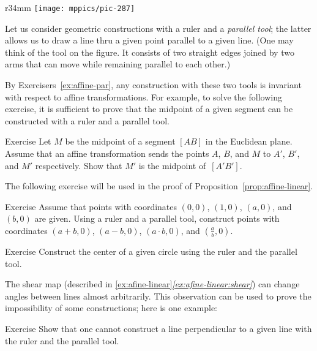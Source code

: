\begin{wrapfigure}{r}{34mm}
\vskip-15mm
\centering
\texttt{[image: mppics/pic-287]}
\end{wrapfigure}

Let us consider geometric constructions with a ruler and a \emph{parallel tool};
the latter allows us to draw a line thru a given point parallel to a given line.
(One may think of the tool on the figure.
It consists of two straight edges joined by two arms that can move while remaining parallel to each other.)

By Exercisers~\ref{ex:affine-par}, any construction with these two tools is invariant with respect to affine transformations.
For example, 
to solve the following exercise,
it is sufficient to prove that the midpoint of a given segment can be constructed with a ruler and a parallel tool.

\begin{thm}{Exercise}\label{ex:midpoint-affine}
Let $M$ be the  midpoint of a segment $[AB]$ in the Euclidean plane.
Assume that an affine transformation sends the points $A$, $B$, and $M$
to $A'$, $B'$, and $M'$ respectively.
Show that $M'$ is the midpoint of~$[A'B']$.
\end{thm}

The following exercise will be used in the proof of Proposition~\ref{prop:affine-linear}.

\begin{thm}{Exercise}\label{ex:R-hom}
Assume that points with coordinates $(0,0)$, $(1,0)$, $(a,0)$, and $(b,0)$ are given.
Using a ruler and a parallel tool, construct points with coordinates $(a+b,0)$, $(a-b,0)$, $(a\cdot b,0)$, and $(\tfrac a b,0)$.
\end{thm}

\begin{thm}{Exercise}\label{ex:center-circ-affine}
Construct the center of a given circle using the ruler and the parallel tool.
\end{thm}

The shear map (described in \ref{ex:afine-linear}\textit{\ref{ex:afine-linear:shear}}) can change angles between lines almost arbitrarily.
This observation can be used to prove the impossibility of some constructions;
here is one example:

\begin{thm}{Exercise}\label{ex:affine-perp}
Show that one cannot construct a line perpendicular to a given line with the ruler and the parallel tool.
\end{thm}

